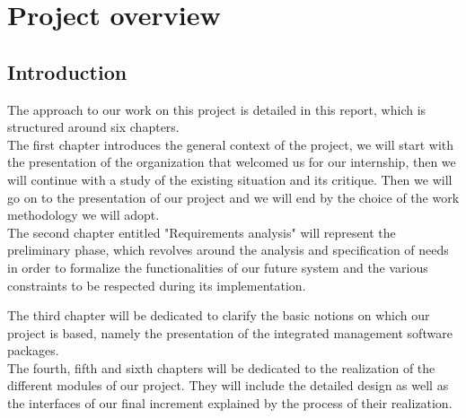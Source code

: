 \chapter{Project overview}
\section*{Introduction}
The approach to our work on this project is detailed in this report, which is structured around six chapters.\\

The first chapter introduces the general context of the project, we will start with the presentation of the organization that welcomed us for our internship, then we will continue with a study of the existing situation and its critique. Then we will go on to the presentation of our project and we will end by the choice of the work methodology we will adopt.  \\

The second chapter entitled "Requirements analysis" will represent the preliminary phase, which revolves around the analysis and specification of needs in order to formalize the functionalities of our future system and the various constraints to be respected during its implementation. 

The third chapter  will be dedicated to clarify the basic notions on which our project is based, namely the presentation of the integrated management software packages.\\

The fourth, fifth and sixth chapters will be dedicated to the realization of the different modules of our project. They will include the detailed design as well as the interfaces of our final increment explained by the process of their realization. 


